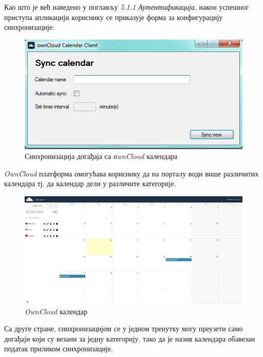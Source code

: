 Као што је већ наведено у поглављу \textit{5.1.1 Аутентификација}, након успешног приступа апликацији кориснику се приказује форма за конфигурацију синхронизације:

\begin{figure}[H]
	\centering
	\includegraphics[scale=0.5]{slike/SyncCalendar.png}
	\caption{Синхронизација догађаја са \textit{оwnCloud} календара}
	\label{fig:sync_calendar}
\end{figure}


\textit{OwnCloud} платформа омогућава кориснику да на порталу води више различитих календара тј. да календар дели у различите категорије. 

\begin{figure}[H]
	\centering
	\includegraphics[scale=0.5]{slike/ownCloudCalendar.png}
	\caption{\textit{OwnCloud} календар}
	\label{fig:own_cloud_calendar}
\end{figure}

Са друге стране, синхронизацијом се у једном тренутку могу преузети само догађаји који су везани за једну категорију, тако да је назив календара обавезан податак приликом синхронизације.